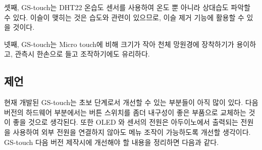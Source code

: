 셋째, GS-touch는 DHT22 온습도 센서를 사용하여 온도 뿐 아니라 상대습도 파악할 수 있다. 이슬이 맺히는 것은 습도와 관련이 있으므로, 이슬 제거 기능에 활용할 수 있을 것이다. 

넷째, GS-touch는 Micro touch에 비해 크기가 작아 천체 망원경에 장착하기가 용이하고, 관측시 한손으로 들고 조작하기에도 유리하다. 

\subsection{제언}

현재 개발된 GS-touch는 초보 단계로서 개선할 수 있는 부분들이 아직 많이 있다. 다음 버전의 하드웨어 부분에서는 버튼 스위치를 좀더 내구성이 좋은 부품으로 교체하는 것이 좋을 것으로 생각된다. 또한 OLED 와 센서의 전원은 아두이노에서 출력되는 전원을 사용하여 외부 전원을 연결하지 않아도 메뉴 조작이 가능하도록 개선할 생각이다. GS-touch 다음 버전 제작시에 개선해야 할 내용을 정리하면 다음과 같다. 

